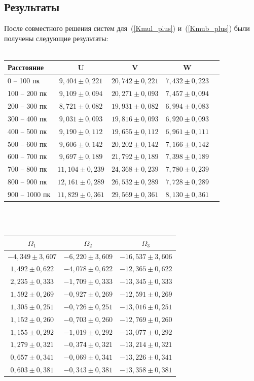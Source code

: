 \documentclass[14pt]{article} %
\begin{document}
\subsection{Результаты}
После совместного решения систем для~(\ref{Kmul_plus}) и~(\ref{Kmub_plus}) были получены следующие результаты:\\\\
\begin{tabular}{|p{3.1cm}|c|c|c|c|}
\hline
Расстояние&U&V&W\\
\hline
0 -- 100 пк&$	9,404	\pm	0,221	$&$	20,742	\pm	0,221	$&$	7,432	\pm	0,223$\\
100 -- 200	пк&$	9,109	\pm	0,094	$&$	20,271	\pm	0,093	$&$	7,457	\pm	0,094$\\
200 -- 300	пк&$	8,721	\pm	0,082	$&$	19,931	\pm	0,082	$&$	6,994	\pm	0,083$\\
300 -- 400	пк&$	9,031	\pm	0,093	$&$	19,816	\pm	0,093	$&$	6,920	\pm	0,093$\\
400 -- 500	пк&$	9,190	\pm	0,112	$&$	19,655	\pm	0,112	$&$	6,961	\pm	0,111$\\
500 -- 600	пк&$	9,606	\pm	0,142	$&$	20,202	\pm	0,142	$&$	7,166	\pm	0,142$\\
600 -- 700	пк&$	9,697	\pm	0,189	$&$	21,792	\pm	0,189	$&$	7,398	\pm	0,189$\\
700 -- 800	пк&$	11,104	\pm	0,239	$&$	24,368	\pm	0,239	$&$	7,780	\pm	0,239$\\
800 -- 900	пк&$	12,161	\pm	0,289	$&$	26,532	\pm	0,289	$&$	7,728	\pm	0,289$\\
900 -- 1000	пк&$	11,829	\pm	0,361	$&$	29,569	\pm	0,361	$&$	8,130	\pm	0,361$\\
\hline
\end{tabular}\\\\
\begin{tabular}{|c|c|c|}
\hline
$\Omega_1$&$\Omega_2$&$\Omega_3$\\
\hline
$-4,349	\pm	3,607	$&$	-6,220	\pm	3,609	$&$	-16,537	\pm	3,606$\\
$1,492	\pm	0,622	$&$	-4,078	\pm	0,622	$&$	-12,365	\pm	0,622$\\
$2,235	\pm	0,333	$&$	-1,709	\pm	0,333	$&$	-13,345	\pm	0,333$\\
$1,592	\pm	0,269	$&$	-0,927	\pm	0,269	$&$	-12,591	\pm	0,269$\\
$1,305	\pm	0,251	$&$	-0,726	\pm	0,251	$&$	-13,016	\pm	0,251$\\
$1,152	\pm	0,260	$&$	-0,703	\pm	0,260	$&$	-12,769	\pm	0,260$\\
$1,155	\pm	0,292	$&$	-1,019	\pm	0,292	$&$	-13,077	\pm	0,292$\\
$1,279	\pm	0,321	$&$	-0,374	\pm	0,321	$&$	-13,214	\pm	0,321$\\
$0,657	\pm	0,341	$&$	-0,069	\pm	0,341	$&$	-13,226	\pm	0,341$\\
$0,603	\pm	0,381	$&$	-0,343	\pm	0,381	$&$	-13,358	\pm	0,381$\\
\hline
\end{tabular}\\\\
\end{document}
